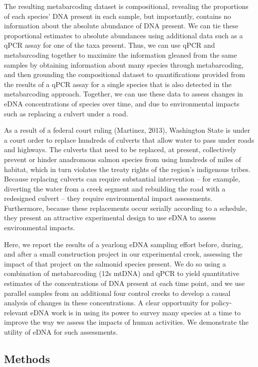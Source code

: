 \documentclass[
]{article}
\begin{document}
The resulting metabarcoding dataset is compositional, revealing the
proportions of each species' DNA present in each sample, but
importantly, contains no information about the absolute abundance of DNA
present. We can tie these proportional estimates to absolute abundances
using additional data such as a qPCR assay for one of the taxa present.
Thus, we can use qPCR and metabarcoding together to maximize the
information gleaned from the same samples by obtaining information about
many species through metabarcoding, and then grounding the compositional
dataset to quantifications provided from the results of a qPCR assay for
a single species that is also detected in the metabarcoding approach.
Together, we can use these data to assess changes in eDNA concentrations
of species over time, and due to environmental impacts such as replacing
a culvert under a road.

As a result of a federal court ruling (Martinez, 2013), Washington State
is under a court order to replace hundreds of culverts that allow water
to pass under roads and highways. The culverts that need to be replaced,
at present, collectively prevent or hinder anadromous salmon species
from using hundreds of miles of habitat, which in turn violates the
treaty rights of the region's indigenous tribes. Because replacing
culverts can require substantial intervention -- for example, diverting
the water from a creek segment and rebuilding the road with a redesigned
culvert -- they require environmental impact assessments. Furthermore,
because these replacements occur serially according to a schedule, they
present an attractive experimental design to use eDNA to assess
environmental impacts.

Here, we report the results of a yearlong eDNA sampling effort before,
during, and after a small construction project in our experimental
creek, assessing the impact of that project on the salmonid species
present. We do so using a combination of metabarcoding (12s mtDNA) and
qPCR to yield quantitative estimates of the concentrations of DNA
present at each time point, and we use parallel samples from an
additional four control creeks to develop a causal analysis of changes
in these concentrations. A clear opportunity for policy-relevant eDNA
work is in using its power to survey many species at a time to improve
the way we assess the impacts of human activities. We demonstrate the
utility of eDNA for such assessments.

\hypertarget{methods}{%
\subsection{Methods}\label{methods}}
\end{document}
